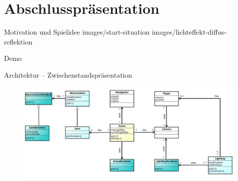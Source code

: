 

\subtitle{Game Programming}



\slidetitle
\section*{Abschlusspräsentation}

\slideonetoonegraphics
{Motivation und Spielidee}
{images/start-situation}
{}
{images/lichteffekt-diffus-reflektion}
{}



\begin{frame}{Demo}
	\centering
\end{frame}

\begin{frame}{Architektur -- Zwischenstandspräsentation}
	\begin{figure}
		\centering
		\includegraphics[width=\textwidth, height=0.7\textheight, keepaspectratio]{images/klassendiagramm}
	\end{figure}
\end{frame}

